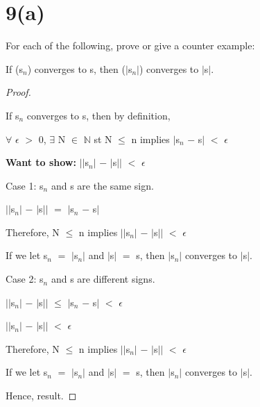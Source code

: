 \documentclass{article}
\newcommand{\mt}[1]{\ensuremath{#1}}
\newcommand\bsc[2][\DefaultOpt]{%
  \def\DefaultOpt{#2}%
  \section[#1]{#2}%
}
\newcommand{\bgpf}{\begin{proof} $ $\newline}
\newcommand{\wts}[1]{\textbf{Want to show: } #1}
\newcommand{\epf}{\end{proof}}
\newcommand{\bn}{\mt{\mathbb{N}} }       %
\newcommand{\ep}{\mt{\epsilon} }         %
\newcommand{\fa}{\mt{\forall} }          %
\newcommand{\mem}{\mt{\in} }
\newcommand{\exs}{\mt{\exists} }
\newcommand{\av}[1]{\mt{|}#1\mt{|}}  %
\newcommand{\prn}[1]{(#1)}
\newcommand{\ms}{\mt{-} }
\newcommand{\ls}{\mt{<} }
\newcommand{\gr}{\mt{>} }
\newcommand{\lse}{\mt{\leq} }
\newcommand{\eql}{\mt{=} }
\newcommand{\uw}[2]{#1\mt{_{#2}}}
\begin{document}
\bsc{9(a)}{
For each of the following, prove or give a counter example:

If (\uw{s}{n}) converges to s, then \prn{\av{\uw{s}{n}}} converges to \av{s}.

\bgpf

If \uw{s}{n} converges to s, then by definition,

\fa \ep \gr 0, \exs N \mem \bn st N \lse n implies \av{\uw{s}{n} \ms s} \ls \ep

\wts{\av{\av{\uw{s}{n}} \ms \av{s}} \ls \ep}

Case 1: \uw{s}{n} and s are the same sign.

\av{\av{\uw{s}{n}} \ms \av{s}} \eql \av{\uw{s}{n} \ms s}

Therefore, N \lse n implies \av{\av{\uw{s}{n}} \ms \av{s}} \ls \ep

If we let \uw{s}{n} \eql \av{\uw{s}{n}} and \av{s} \eql s, then \av{\uw{s}{n}} converges to \av{s}.

Case 2: \uw{s}{n} and s are different signs.

\av{\av{\uw{s}{n}} \ms \av{s}} \lse \av{\uw{s}{n} \ms s} \ls \ep

\av{\av{\uw{s}{n}} \ms \av{s}} \ls \ep

Therefore, N \lse n implies \av{\av{\uw{s}{n}} \ms \av{s}} \ls \ep

If we let \uw{s}{n} \eql \av{\uw{s}{n}} and \av{s} \eql s, then \av{\uw{s}{n}} converges to \av{s}.

Hence, result.

\epf

}

\newpage
\end{document}
